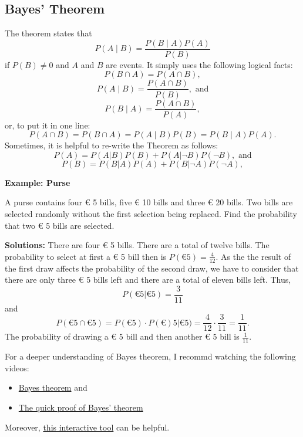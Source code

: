 \documentclass[
  12pt,
  oneside]{book}
\providecommand{\tightlist}{%
  \setlength{\itemsep}{0pt}\setlength{\parskip}{0pt}}
\theoremstyle{definition}
\theoremstyle{definition}
\theoremstyle{definition}
\theoremstyle{definition}
\theoremstyle{remark}
\begin{document}
\hypertarget{bayes-theorem}{%
\subsection{Bayes' Theorem}\label{bayes-theorem}}

The theorem states that
\[P(A\mid B)={\frac {P(B\mid A)P(A)}{P(B)}} \]
if \(P(B)\neq 0\) and \(A\) and \(B\) are events. It simply uses the following logical facts:
\[P(B\cap A)=P(A\cap B),\]
\[P(A\mid B)=\frac {P(A\cap B)}{P(B)},  \text{ and}\]
\[P(B\mid A)=\frac {P(A\cap B)}{P(A)},\]
or, to put it in one line:
\[  P(A\cap B)= P(B\cap A)=P(A\mid B)P(B)=P(B\mid A)P(A).   \]
Sometimes, it is helpful to re-write the Theorem as follows:
\[P(A)=P(A|B)P(B)+P(A|\neg B)P(\neg B),  \text{ and}\]
\[P(B)=P(B|A)P(A)+P(B|\neg A)P(\neg A),\]

\textbf{Example: Purse}

A purse contains four € 5 bills, five € 10 bills and three € 20 bills. Two bills are selected randomly without the first selection being replaced. Find the probability that two € 5 bills are selected.

\textbf{Solutions:} There are four € 5 bills. There are a total of twelve bills.
The probability to select at first a € 5 bill then is \(P(\text{€} 5) = \frac{4}{12}\).
As the the result of the first draw affects the probability of the second draw, we have to consider that there are only three € 5 bills left and there are a total of eleven bills left. Thus,
\[
P(\text{€} 5 | \text{€} 5)=\frac{3}{11}
\]
and
\[
P(\text{€} 5 \cap \text{€} 5) = P(\text{€} 5) \cdot P(\text{€}) 5 | \text{€} 5) = \frac{4}{12} \cdot \frac{3}{11}=\frac{1}{11}.
\]
The probability of drawing a € 5 bill and then another € 5 bill is \(\frac{1}{11}\).

For a deeper understanding of Bayes theorem, I recommd watching the following videos:

\begin{itemize}
\tightlist
\item
  \href{https://youtu.be/HZGCoVF3YvM}{Bayes theorem} and
\item
  \href{https://youtu.be/U_85TaXbeIo}{The quick proof of Bayes' theorem}
\end{itemize}

Moreover, \href{https://www.skobelevs.ie/BayesTheorem/}{this interactive tool} can be helpful.
\end{document}
